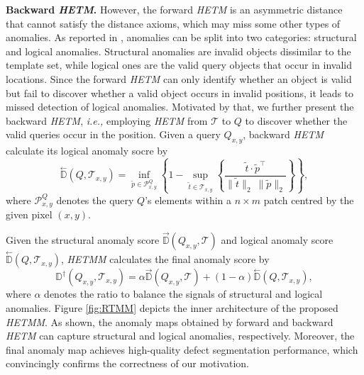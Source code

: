 \documentclass[default,iicol]{sn-jnl}\usepackage[algo2e,ruled,linesnumbered]{algorithm2e}
\theoremstyle{thmstyleone}\newtheorem{theorem}{Theorem}\newtheorem{proposition}[theorem]{Proposition}
\theoremstyle{thmstyletwo}\newtheorem{example}{Example}\newtheorem{remark}{Remark}
\theoremstyle{thmstylethree}\newtheorem{definition}{Definition}
\begin{document}
\noindent\textbf{Backward \textit{HETM}. }However, the forward \textit{HETM} is an asymmetric distance that cannot satisfy the distance axioms, which may miss some other types of anomalies.
As reported in \cite{MVTECLOCO}, anomalies can be split into two categories: structural and logical anomalies.
Structural anomalies are invalid objects dissimilar to the template set, while logical ones are the valid query objects that occur in invalid locations.
Since the forward \textit{HETM} can only identify whether an object is valid but fail to discover whether a valid object occurs in invalid positions, it leads to missed detection of logical anomalies.
Motivated by that, we further present the backward \textit{HETM}, \emph{i.e.,} employing \textit{HETM} from $\mathcal{T}$ to $Q$ to discover whether the valid queries occur in the position.
Given a query $Q_{x,y}$, backward \textit{HETM} calculate its logical anomaly socre by
\begin{equation} 
    \overset{\gets}{\mathbb{D}}(Q, \mathcal{T}_{x,y}) = \!\!\!\inf\limits_{\tilde{p}\in\mathcal{P}^{Q}_{x,y}}\!\left\{1\!-\!\!\sup\limits_{\tilde{t}\in \mathcal{T}_{x,y}}\!\left\{\frac{\tilde{t}\cdot\tilde{p}^{\top}}{\|\tilde{t}\|_{2}\ \|\tilde{p}\|_{2}}\right\}\!\right\},
    \label{eq:DTQ}
\end{equation}
where $\mathcal{P}^{Q}_{x,y}$ denotes the query $Q$'s elements within a $n\!\!\times\!\!m$ patch centred by the given pixel $(x,y)$.

Given the structural anomaly score $\overset{\to}{\mathbb{D}}(Q_{x,y}, \mathcal{T})$ and logical anomaly score $\overset{\gets}{\mathbb{D}}(Q, \mathcal{T}_{x,y})$, \textit{HETMM} calculates the final anomaly score by
\begin{equation}
    \mathbb{D}^{\dagger}\!(Q_{x,y},\!\! \mathcal{T}_{x,y})\! =\! \alpha\overset{\rightarrow}{\mathbb{D}}(Q_{x,y}, \!\!\mathcal{T})\! + \!(1-\alpha)\overset{\leftarrow}{\mathbb{D}}(Q,\!\! \mathcal{T}_{x,y}),
    \label{eq:merge}
\end{equation}
where $\alpha$ denotes the ratio to balance the signals of structural and logical anomalies.
Figure \ref{fig:RTMM} depicts the inner architecture of the proposed \textit{HETMM}.
As shown, the anomaly maps obtained by forward and backward \textit{HETM} can capture structural and logical anomalies, respectively.
Moreover, the final anomaly map achieves high-quality defect segmentation performance, which convincingly confirms the correctness of our motivation.
\end{document}
